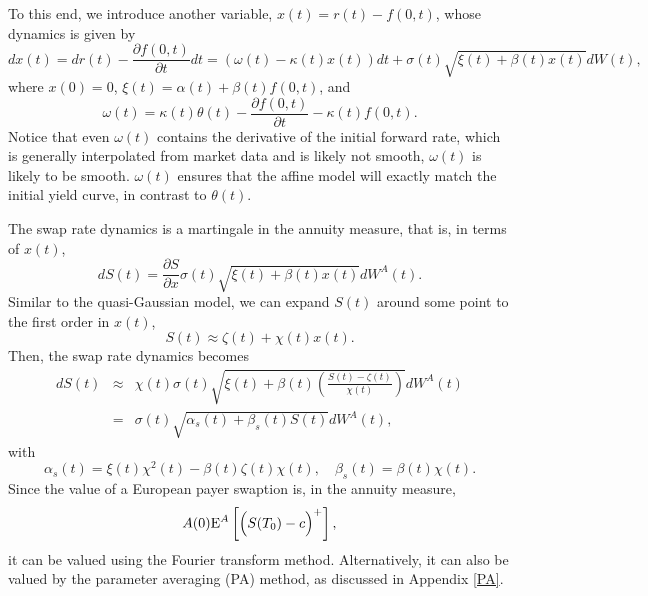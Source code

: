 \documentclass[12pt]{article}
\begin{document}
      To this end, we introduce another variable, $x(t)=r(t)-f(0,t)$, whose dynamics is given by
      \begin{equation}
        dx(t)=dr(t)-\frac{\partial f(0,t)}{\partial t}dt=\left(\omega(t)-\kappa(t)x(t)\right)dt+\sigma(t)\sqrt{\xi(t)+\beta(t) x(t)}dW(t),
      \end{equation}
      where $x(0)=0$, $\xi(t)=\alpha(t) +\beta(t) f(0,t)$, and
      \begin{equation}
        \omega(t)=\kappa(t)\theta(t)-\frac{\partial f(0,t)}{\partial t}-\kappa(t)f(0,t).
      \end{equation}
      Notice that even $\omega(t)$ contains the derivative of the initial forward rate, which is generally interpolated from market data and
      is likely not smooth, $\omega(t)$ is likely to be smooth. $\omega(t)$ ensures that the affine model will exactly match the initial
      yield curve, in contrast to $\theta(t)$.

      The swap rate dynamics is a martingale in the annuity measure, that is, in terms of $x(t)$,
      \begin{equation}
        dS(t)=\frac{\partial S}{\partial x}\sigma(t)\sqrt{\xi(t)+\beta(t) x(t)}dW^A(t).
      \end{equation}
      Similar to the quasi-Gaussian model, we can expand $S(t)$ around some point to the first order in $x(t)$,
      \begin{equation}
        S(t)\approx \zeta(t)+\chi(t)x(t).
      \end{equation}
      Then, the swap rate dynamics becomes
      \begin{eqnarray}
        dS(t)&\approx&\chi(t)\sigma(t)\sqrt{\xi(t)+\beta(t) \left(\frac{S(t)-\zeta(t)}{\chi(t)}\right)}dW^A(t)\nonumber\\
             &=& \sigma(t)\sqrt{\alpha_s(t)+\beta_s(t)S(t)}dW^A(t),
      \end{eqnarray}
      with
      \begin{equation}
        \alpha_s(t)=\xi(t)\chi^2(t)-\beta(t)\zeta(t)\chi(t), \quad \beta_s(t)=\beta(t)\chi(t).
      \end{equation}
      Since the value of a European payer swaption is, in the annuity measure,
      \begin{equation}
        A(0){\rm E}^A\left[\Big(S(T_0)-c\Big)^+\right],
      \end{equation}
      it can be valued using the Fourier transform method. Alternatively, it can also be valued by the parameter averaging (PA) method,
      as discussed in Appendix \ref{PA}.
\end{document}
